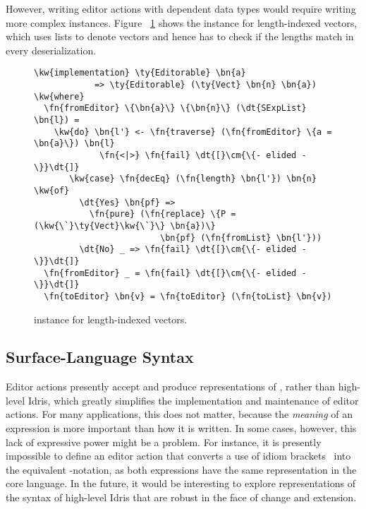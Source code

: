 However, writing editor actions with dependent data types would require writing
more complex \Editorable{} instances.  Figure ~\ref{code:editorable-vect} shows the
\Editorable{} instance for length-indexed vectors, which uses lists to denote
vectors and hence has to check if the lengths match in every deserialization.

\begin{figure}[H]
\begin{Verbatim}
\kw{implementation} \ty{Editorable} \bn{a}
            => \ty{Editorable} (\ty{Vect} \bn{n} \bn{a}) \kw{where}
  \fn{fromEditor} \{\bn{a}\} \{\bn{n}\} (\dt{SExpList} \bn{l}) =
    \kw{do} \bn{l'} <- \fn{traverse} (\fn{fromEditor} \{a = \bn{a}\}) \bn{l}
             \fn{<|>} \fn{fail} \dt{[}\cm{\{- elided -\}}\dt{]}
       \kw{case} \fn{decEq} (\fn{length} \bn{l'}) \bn{n} \kw{of}
         \dt{Yes} \bn{pf} =>
           \fn{pure} (\fn{replace} \{P = (\kw{\`}\ty{Vect}\kw{\`}\} \bn{a})\}
                         \bn{pf} (\fn{fromList} \bn{l'}))
         \dt{No} _ => \fn{fail} \dt{[}\cm{\{- elided -\}}\dt{]}
  \fn{fromEditor} _ = \fn{fail} \dt{[}\cm{\{- elided -\}}\dt{]}
  \fn{toEditor} \bn{v} = \fn{toEditor} (\fn{toList} \bn{v})
\end{Verbatim}
\caption{\Editorable{} instance for length-indexed vectors.}
\label{code:editorable-vect}
\end{figure}

\subsection{Surface-Language Syntax}

Editor actions presently accept and produce representations of \TT{},
rather than high-level Idris, which greatly simplifies the
implementation and maintenance of editor actions. For many
applications, this does not matter, because the \emph{meaning} of an
expression is more important than how it is written. In some cases,
however, this lack of expressive power might be a problem. For
instance, it is presently impossible to define an editor action that
converts a use of idiom brackets~\citep{Applicative} into the
equivalent -notation, as both expressions have the same
representation in the core language. In the future, it would be
interesting to explore representations of the syntax of high-level
Idris that are robust in the face of change and extension.



